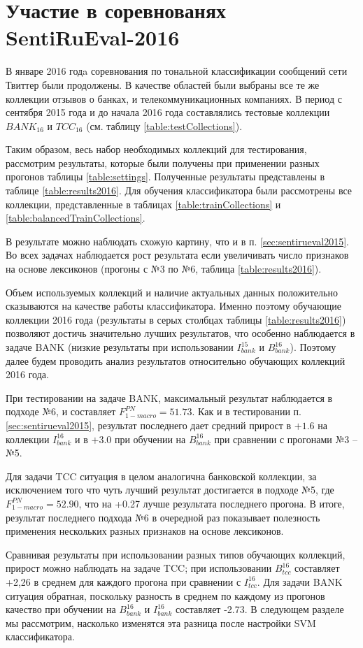 \section{Участие в соревнованях SentiRuEval-2016}
\label{sec:sentirueval2016}

В январе 2016 годa соревнования по тональной классификации сообщений
сети Твиттер были продолжены.
В качестве областей были выбраны все те же коллекции отзывов о банках,
и телекоммуникационных компаниях. В период с сентября 2015 года и до начала
2016 года составлялись тестовые коллекции $BANK_{16}$ и $TCC_{16}$ (см.
таблицу \ref{table:testCollections}).

Таким образом, весь набор необходимых коллекций для тестирования, рассмотрим
результаты, которые были получены при применении разных прогонов таблицы
\ref{table:settings}.
Полученные результаты представлены в таблице \ref{table:results2016}.
Для обучения классификатора были рассмотрены все коллекции, представленные в
таблицах \ref{table:trainCollections} и \ref{table:balancedTrainCollections}.



В результате можно наблюдать схожую картину, что и в п. \ref{sec:sentirueval2015}.
Во всех задачах наблюдается рост результата если увеличивать число признаков
на основе лексиконов (прогоны с №3 по №6, таблица \ref{table:results2016}).

Объем используемых коллекций и наличие актуальных данных положительно сказываются
на качестве работы классификатора.
Именно поэтому обучающие коллекции 2016 года
(результаты в серых столбцах таблицы \ref{table:results2016})
позволяют достичь значительно лучших результатов, что особенно
наблюдается в задаче BANK (низкие результаты при использовании $I_{bank}^{15}$
и $B_{bank}^{16}$).
Поэтому далее будем проводить анализ результатов относительно обучающих
коллекций 2016 года.

При тестировании на задаче BANK, максимальный результат наблюдается
в подходе №6, и составляет $F_{1-macro}^{PN} = 51.73$.
Как и в тестировании п. \ref{sec:sentirueval2015}, результат последнего
дает средний прирост в $+1.6$ на коллекции $I_{bank}^{16}$ и в $+3.0$
при обучении на $B_{bank}^{16}$ при сравнении с прогонами №3 -- №5.

Для задачи TCC ситуация в целом аналогична банковской коллекции, за исключением
того что чуть лучший результат достигается в подходе №5, где
$F_{1-macro}^{PN} = 52.90$,
что на +0.27 лучше результата последнего прогона.
В итоге, результат последнего подхода №6 в очередной раз показывает полезность
применения нескольких разных признаков на основе лексиконов.

Сравнивая результаты при использовании разных типов обучающих коллекций,
прирост можно наблюдать на задаче TCC; при использовании $B_{tcc}^{16}$
составляет +2,26 в среднем для каждого прогона при сравнении с $I_{tcc}^{16}$.
Для задачи BANK ситуация обратная, поскольку разность в среднем по каждому
из прогонов качество при обучении на $B_{bank}^{16}$  и $I_{bank}^{16}$
составляет -2.73.
В следующем разделе мы рассмотрим, насколько изменятся эта разница после
настройки SVM классификатора.
